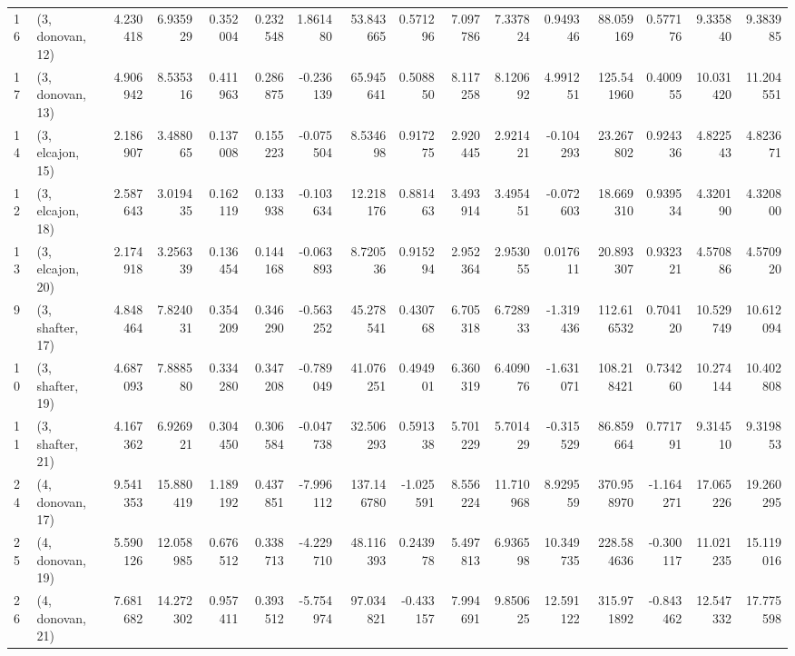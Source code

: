 \begin{tabular}{llrrrrrrrrrrrrrr}
16 &  (3, donovan, 12) &  4.230418 &   6.935929 &   0.352004 &  0.232548 &  1.861480 &   53.843665 &  0.571296 &   7.097786 &   7.337824 &   0.949346 &   88.059169 &  0.577176 &   9.335840 &   9.383985 \\
17 &  (3, donovan, 13) &  4.906942 &   8.535316 &   0.411963 &  0.286875 & -0.236139 &   65.945641 &  0.508850 &   8.117258 &   8.120692 &   4.991251 &  125.541960 &  0.400955 &  10.031420 &  11.204551 \\
14 &  (3, elcajon, 15) &  2.186907 &   3.488065 &   0.137008 &  0.155223 & -0.075504 &    8.534698 &  0.917275 &   2.920445 &   2.921421 &  -0.104293 &   23.267802 &  0.924336 &   4.822543 &   4.823671 \\
12 &  (3, elcajon, 18) &  2.587643 &   3.019435 &   0.162119 &  0.133938 & -0.103634 &   12.218176 &  0.881463 &   3.493914 &   3.495451 &  -0.072603 &   18.669310 &  0.939534 &   4.320190 &   4.320800 \\
13 &  (3, elcajon, 20) &  2.174918 &   3.256339 &   0.136454 &  0.144168 & -0.063893 &    8.720536 &  0.915294 &   2.952364 &   2.953055 &   0.017611 &   20.893307 &  0.932321 &   4.570886 &   4.570920 \\
9  &  (3, shafter, 17) &  4.848464 &   7.824031 &   0.354209 &  0.346290 & -0.563252 &   45.278541 &  0.430768 &   6.705318 &   6.728933 &  -1.319436 &  112.616532 &  0.704120 &  10.529749 &  10.612094 \\
10 &  (3, shafter, 19) &  4.687093 &   7.888580 &   0.334280 &  0.347208 & -0.789049 &   41.076251 &  0.494901 &   6.360319 &   6.409076 &  -1.631071 &  108.218421 &  0.734260 &  10.274144 &  10.402808 \\
11 &  (3, shafter, 21) &  4.167362 &   6.926921 &   0.304450 &  0.306584 & -0.047738 &   32.506293 &  0.591338 &   5.701229 &   5.701429 &  -0.315529 &   86.859664 &  0.771791 &   9.314510 &   9.319853 \\
24 &  (4, donovan, 17) &  9.541353 &  15.880419 &   1.189192 &  0.437851 & -7.996112 &  137.146780 & -1.025591 &   8.556224 &  11.710968 &   8.929559 &  370.958970 & -1.164271 &  17.065226 &  19.260295 \\
25 &  (4, donovan, 19) &  5.590126 &  12.058985 &   0.676512 &  0.338713 & -4.229710 &   48.116393 &  0.243978 &   5.497813 &   6.936598 &  10.349735 &  228.584636 & -0.300117 &  11.021235 &  15.119016 \\
26 &  (4, donovan, 21) &  7.681682 &  14.272302 &   0.957411 &  0.393512 & -5.754974 &   97.034821 & -0.433157 &   7.994691 &   9.850625 &  12.591122 &  315.971892 & -0.843462 &  12.547332 &  17.775598 \\

\end{tabular}
